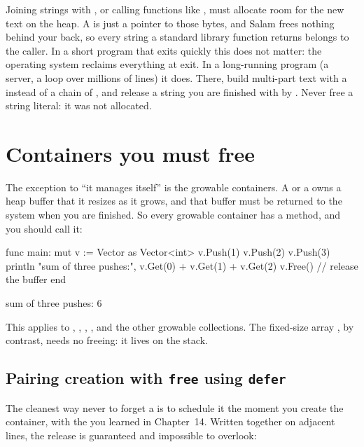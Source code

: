 \begin{deep}
Joining strings with \code{+}, or calling functions like , must
allocate room for the new text on the heap. A  is just a pointer to
those bytes, and Salam frees nothing behind your back, so every string a standard
library function returns belongs to the caller. In a short program that exits
quickly this does not matter: the operating system reclaims everything at exit.
In a long-running program (a server, a loop over millions of lines) it does.
There, build multi-part text with a  instead of a chain of
\code{+}, and release a string you are finished with by
. Never free a string literal: it was not allocated.
\end{deep}

\section{Containers you must free}

The exception to ``it manages itself'' is the growable containers. A
 or a  owns a heap buffer that it resizes as
it grows, and that buffer must be returned to the system when you are finished. So
every growable container has a  method, and you should call it:

\begin{salamen}
func main:
    mut v := Vector {} as Vector<int>
    v.Push(1)
    v.Push(2)
    v.Push(3)
    println "sum of three pushes:", v.Get(0) + v.Get(1) + v.Get(2)
    v.Free()              // release the buffer
end
\end{salamen}

\begin{progout}
sum of three pushes: 6
\end{progout}

This applies to , , , , and the
other growable collections. The fixed-size array , by contrast, needs
no freeing: it lives on the stack.

\subsection{Pairing creation with \texttt{free} using \texttt{defer}}

The cleanest way never to forget a  is to schedule it the moment you
create the container, with the  you learned in Chapter~14. Written
together on adjacent lines, the release is guaranteed and impossible to overlook:

